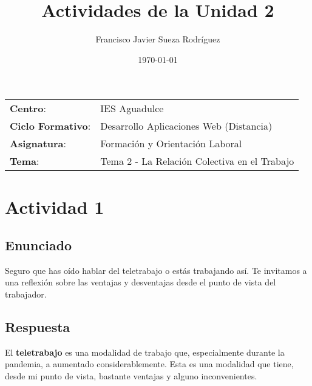 


\title{
\vspace{10ex}
\normalfont \normalsize
\huge \textbf{Actividades de la Unidad 2}
}
\author{Francisco Javier Sueza Rodríguez}
\date{\normalsize\today}



\maketitle

\thispagestyle{empty}

\vspace{75ex}

\begin{center}
    \begin{tabular}{l l}
        \textbf{Centro}: & IES Aguadulce \\
        \textbf{Ciclo Formativo}: & Desarrollo Aplicaciones Web (Distancia)\\
        \textbf{Asignatura}: & Formación y Orientación Laboral\\
        \textbf{Tema}: & Tema 2 -  La Relación Colectiva en el Trabajo\\
    \end{tabular}
\end{center}

\newpage

\section{Actividad 1}
\subsection{Enunciado}
Seguro que has oído hablar del teletrabajo o estás trabajando así. Te invitamos a una reflexión sobre las ventajas y desventajas desde el punto de vista del trabajador.

\subsection{Respuesta}
El \textbf{teletrabajo} es una modalidad de trabajo que, especialmente durante la pandemia, a aumentado considerablemente. Esta es una modalidad que tiene, desde mi punto de vista, bastante ventajas y alguno inconvenientes.


